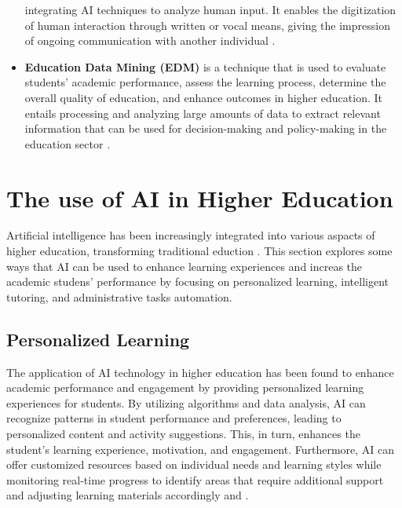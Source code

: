 \begin{itemize}
	      integrating AI techniques to analyze human input\citep{IBM_withnodate}.
	      It enables the digitization of human interaction through written
	      or vocal means, giving the impression of ongoing communication with another individual \citep{oracle_what_nodate}.
	\item \textbf{Education Data Mining (EDM)}  is a technique that is used to evaluate students' academic performance,
	      assess the learning process, determine the overall quality of education, and enhance outcomes in higher education.
	      It entails processing and analyzing large amounts of data to extract relevant information that can be used for
	      decision-making and policy-making in the education sector \citep{arifin_using_2022}.
\end{itemize}

\section{The use of AI in Higher Education }\label{use-ai}
\justifying
Artificial intelligence has been increasingly integrated into various aspacts of higher
education, transforming traditional eduction \citep{wang_exploring_2023}. This section explores
some ways that AI can be used to enhance learning experiences and increas the academic studens' performance
by focusing on  personalized learning, intelligent tutoring, and administrative tasks automation.

\subsection{Personalized Learning}
The application of AI technology in higher education has been found to enhance academic performance and
engagement by providing personalized learning experiences for students. By utilizing algorithms and
data analysis, AI can recognize patterns in student performance and preferences, leading to personalized
content and activity suggestions. This, in turn, enhances the student's learning experience, motivation,
and engagement. Furthermore, AI can offer customized resources based on individual needs and learning styles
while monitoring real-time progress to identify areas that require additional support and adjusting learning
materials accordingly
\citep{guerrero-quinonez_artificial_2023} and \citep{l_d_of_cs_akshara_first_grade_college_2023}.



